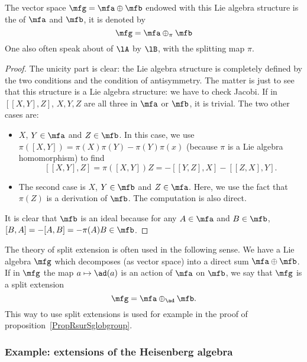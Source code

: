 The vector space $\mfg=\mfa\oplus\mfb$ endowed with this Lie algebra structure is the
 of $\mfa$ and $\mfb$, it is denoted by
\[
	\mfg=\mfa\oplus_{\pi}\mfb
\]
One also often speak about  of $\lA$ by $\lB$, with the splitting map $\pi$.

\begin{proof}
	The unicity part is clear: the Lie algebra structure is completely defined by the two conditions and the condition of antisymmetry. The matter is just to see that this structure is a Lie algebra structure: we have to check Jacobi. If in $[[X,Y],Z]$, $X,Y,Z$ are all three in $\mfa$ or $\mfb$, it is trivial. The two other cases are:
	\begin{itemize}
		\item $X$, $Y\in\mfa$ and $Z\in\mfb$. In this case, we use $\pi([X,Y])=\pi(X)\pi(Y)-\pi(Y)\pi(x)$ (because $\pi$ is a Lie algebra homomorphism) to find
		      \[
			      [[X,Y],Z]=\pi([X,Y])Z=-[[Y,Z],X]-[[Z,X],Y].
		      \]

		\item The second case is $X$, $Y\in\mfb$ and $Z\in\mfa$. Here, we use the fact that $\pi(Z)$ is a derivation of $\mfb$. The computation is also direct.
	\end{itemize}

	It is clear that $\mfb$ is an ideal because for any $A\in\mfa$ and $B\in\mfb$, $[B,A]=-[A,B]=-\pi(A)B\in\mfb$.

\end{proof}

The theory of split extension is often used in the following sense. We have a Lie algebra $\mfg$ which decomposes (as vector space) into a direct sum $\mfa\oplus\mfb$. If in $\mfg$ the map $a\mapsto \ad(a)$ is an action of $\mfa$ on $\mfb$, we say that $\mfg$ is a split extension
\[
	\mfg=\mfa\oplus_{\ad}\mfb.
\]
This way to use split extensions is used for example in the proof of proposition~\ref{PropRsurSglobgroup}.


\subsubsection{Example: extensions of the Heisenberg algebra}

